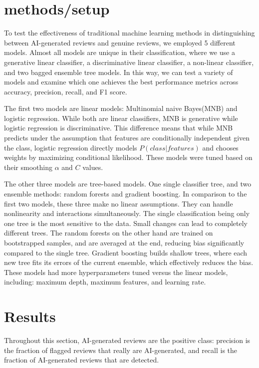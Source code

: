 \documentclass{article}
\begin{document}
\section{methods/setup}
To test the effectiveness of traditional machine learning methods in distinguishing between AI-generated reviews and genuine reviews, we employed 5 different models. Almost all models are unique in their classification, where we use a generative linear classifier, a discriminative linear classifier, a non-linear classifier, and two bagged ensemble tree models. In this way, we can test a variety of models and examine which one achieves the best performance metrics across accuracy, precision, recall, and F1 score. 

The first two models are linear models: Multinomial naive Bayes(MNB) and logistic regression. While both are linear classifiers, MNB is generative while logistic regression is discriminative. This difference means that while MNB predicts under the assumption that features are conditionally independent given the class, logistic regression directly models $P(class|features)$ and chooses weights by maximizing conditional likelihood. These models were tuned based on their smoothing $\alpha$ and $C$ values. 

The other three models are tree-based models. One single classifier tree, and two ensemble methods: random forests and gradient boosting. In comparison to the first two models, these three make no linear assumptions. They can handle nonlinearity and interactions simultaneously. The single classification being only one tree is the most sensitive to the data. Small changes can lead to completely different trees. The random forests on the other hand are trained on bootstrapped samples, and are averaged at the end, reducing bias significantly compared to the single tree. Gradient boosting builds shallow trees, where each new tree fits its errors of the current ensemble, which effectively reduces the bias. These models had more hyperparameters tuned versus the linear models, including: maximum depth, maximum features, and learning rate. 


\section{Results}

Throughout this section, AI-generated reviews are the positive class: precision
is the fraction of flagged reviews that really are AI-generated, and recall is
the fraction of AI-generated reviews that are detected.
\end{document}
